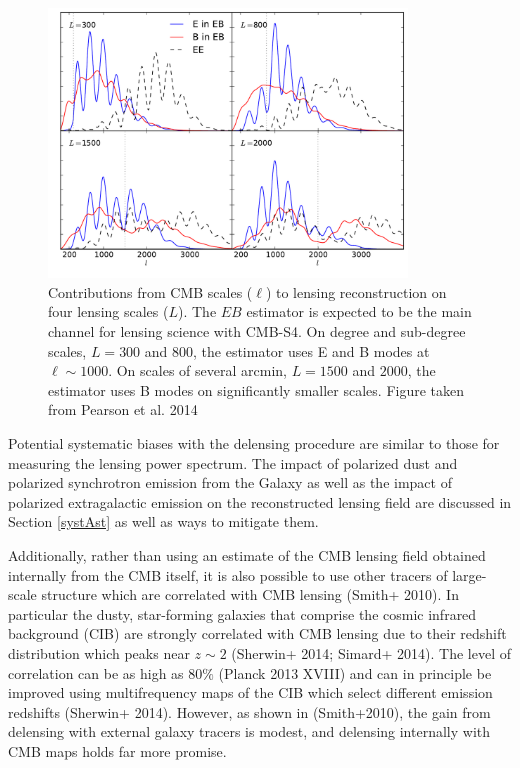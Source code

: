 \documentclass{tcibook}
\begin{document}
\begin{figure}[h]
\centering
\includegraphics[width=0.85\textwidth]{signal_contribs.pdf}
\caption{Contributions from CMB scales ($\ell$) to lensing reconstruction on four lensing scales ($L$).  The $EB$ estimator is expected to be the main channel for lensing science with CMB-S4.  On degree and sub-degree scales, $L = 300$ and $800$, the estimator uses E and B modes at $\ell \sim 1000$.  On scales of several arcmin, $L = 1500$ and $2000$, the estimator uses B modes on significantly smaller scales.  Figure taken from Pearson et al. 2014}
\label{sigCon}
\end{figure}

Potential systematic biases with the delensing procedure are similar to those for measuring the lensing power spectrum. The impact of polarized dust and polarized synchrotron emission from the Galaxy as well as the impact of polarized extragalactic emission on the reconstructed lensing field are discussed in Section \ref{systAst} as well as ways to mitigate them.

Additionally, rather than using an estimate of the CMB lensing field obtained internally from the CMB itself, it is also possible to use other tracers of large-scale structure which are correlated with  CMB lensing (Smith+ 2010).  In particular the dusty, star-forming galaxies that comprise the cosmic infrared background (CIB) are strongly correlated with CMB lensing due to their redshift distribution which peaks near $z \sim 2$ (Sherwin+ 2014; Simard+ 2014).  The level of correlation can be as high as $80\%$ (Planck 2013 XVIII) and can in principle be improved using multifrequency maps of the CIB which select different emission redshifts (Sherwin+ 2014). However, as shown in (Smith+2010), the gain from delensing with external galaxy tracers is modest, and delensing internally with CMB maps holds far more promise.
\end{document}
